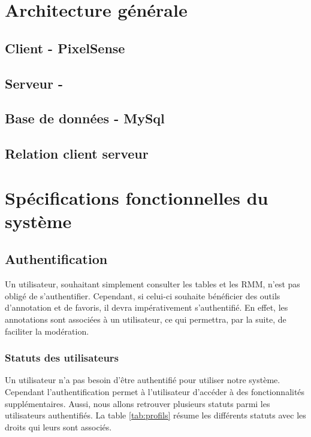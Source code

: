 \documentclass[a4paper]{article}
\begin{document}
\section{Architecture générale}
\subsection{Client - PixelSense}
\subsection{Serveur - }
\subsection{Base de données - MySql}
\subsection{Relation client serveur}

\section{Spécifications fonctionnelles du système}

\subsection{Authentification}

Un utilisateur, souhaitant simplement consulter les tables et les RMM, n'est pas obligé de s'authentifier. Cependant, si celui-ci souhaite bénéficier des outils d'annotation et de favoris, il devra impérativement s'authentifié. En effet, les annotations sont associées à un utilisateur, ce qui permettra, par la suite, de faciliter la modération.

\subsubsection{Statuts des utilisateurs}

Un utilisateur n'a pas besoin d'être authentifié pour utiliser notre système. Cependant l'authentification permet à l'utilisateur d'accéder à des fonctionnalités supplémentaires. Aussi, nous allons retrouver plusieurs statuts parmi les utilisateurs authentifiés. La table \ref{tab:profils} résume les différents statuts avec les droits qui leurs sont associés. 
\end{document}
